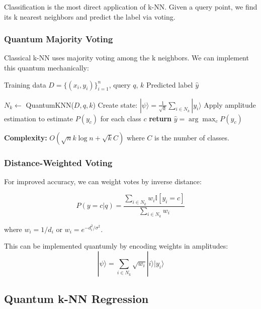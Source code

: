 \documentclass[11pt]{article}
\begin{document}
Classification is the most direct application of k-NN. Given a query point, we find its k nearest neighbors and predict the label via voting.

\subsubsection{Quantum Majority Voting}

Classical k-NN uses majority voting among the k neighbors. We can implement this quantum mechanically:

\begin{algorithm}
\caption{Quantum k-NN Classification}
\begin{algorithmic}[1]
\REQUIRE Training data $D = \{(x_i, y_i)\}_{i=1}^n$, query $q$, $k$
\ENSURE Predicted label $\hat{y}$

\STATE $N_k \leftarrow$ QuantumKNN($D, q, k$) 
\STATE Create state: $|\psi\rangle = \frac{1}{\sqrt{k}} \sum_{i \in N_k} |y_i\rangle$
\STATE Apply amplitude estimation to estimate $P(y_c)$ for each class $c$
\STATE \textbf{return} $\hat{y} = \arg\max_c P(y_c)$
\end{algorithmic}
\end{algorithm}

\textbf{Complexity:} $O(\sqrt{n} k \log n + \sqrt{k} C)$ where $C$ is the number of classes.

\subsubsection{Distance-Weighted Voting}

For improved accuracy, we can weight votes by inverse distance:

\begin{equation}
P(y = c | q) = \frac{\sum_{i \in N_k} w_i \mathbb{I}[y_i = c]}{\sum_{i \in N_k} w_i}
\end{equation}

where $w_i = 1/d_i$ or $w_i = e^{-d_i^2/\sigma^2}$.

This can be implemented quantumly by encoding weights in amplitudes:
\begin{equation}
|\psi\rangle = \sum_{i \in N_k} \sqrt{w_i} |i\rangle |y_i\rangle
\end{equation}

\subsection{Quantum k-NN Regression}
\end{document}
